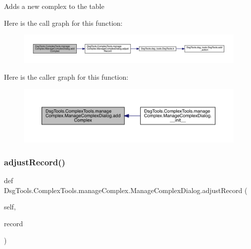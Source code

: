 \begin{DoxyVerb}Adds a new complex to the table
\end{DoxyVerb}
 Here is the call graph for this function\+:
\nopagebreak
\begin{figure}[H]
\begin{center}
\leavevmode
\includegraphics[width=350pt]{class_dsg_tools_1_1_complex_tools_1_1manage_complex_1_1_manage_complex_dialog_a699449c936f5f42b3386bda4dd56f89c_cgraph}
\end{center}
\end{figure}
Here is the caller graph for this function\+:
\nopagebreak
\begin{figure}[H]
\begin{center}
\leavevmode
\includegraphics[width=350pt]{class_dsg_tools_1_1_complex_tools_1_1manage_complex_1_1_manage_complex_dialog_a699449c936f5f42b3386bda4dd56f89c_icgraph}
\end{center}
\end{figure}
\mbox{\label{class_dsg_tools_1_1_complex_tools_1_1manage_complex_1_1_manage_complex_dialog_a536d61fb7b1a56116abdc3dd21d15924}} 
\subsubsection{\texorpdfstring{adjust\+Record()}{adjustRecord()}}
{\footnotesize\ttfamily def Dsg\+Tools.\+Complex\+Tools.\+manage\+Complex.\+Manage\+Complex\+Dialog.\+adjust\+Record (\begin{DoxyParamCaption}\item[{}]{self,  }\item[{}]{record }\end{DoxyParamCaption})}

